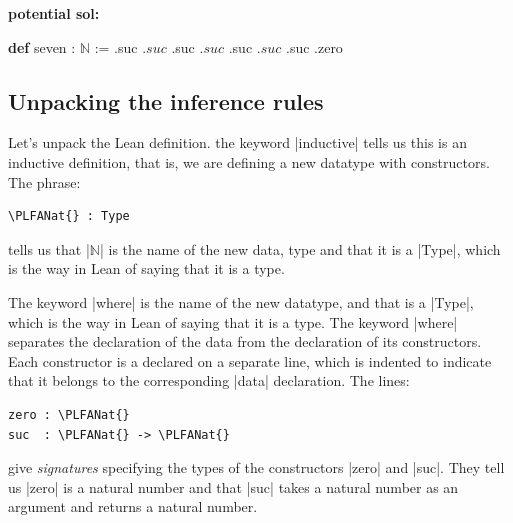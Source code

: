\documentclass{memoir}
\newcommand{\PLFANat}{\ensuremath{\mathbb{N}}}
\begin{document}
\par
\textbf{potential sol:}

\par
\begin{LeanVerbatim}
\textbf{def} seven : \PLFANat{} :=
  .suc $ .suc $ .suc $ .suc $ .suc $ .suc $ .suc .zero
\end{LeanVerbatim}

\par

\subsection{Unpacking the inference rules}\label{PLFA--in--Lean----Part--1----Naturals----Unpacking--the--inference--rules}

\par
Let's unpack the Lean definition. the keyword \LeanVerb|inductive| tells us this is an
inductive definition, that is, we are defining a new datatype with constructors.
The phrase:

\par
\begin{verbatim}
\PLFANat{} : Type
\end{verbatim}

\par
tells us that \LeanVerb|\PLFANat{}| is the name of the new data, type and that it is a \LeanVerb|Type|,
which is the way in Lean of saying that it is a type.

\par
The keyword \LeanVerb|where| is the name of the new datatype, and that is a \LeanVerb|Type|,
which is the way in Lean of saying that it is a type. The keyword \LeanVerb|where|
separates the declaration of the data from the declaration of its constructors.
Each constructor is a declared on a separate line, which is indented to
indicate that it belongs to the corresponding \LeanVerb|data| declaration. The lines:

\par
\begin{verbatim}
zero : \PLFANat{}
suc  : \PLFANat{} -> \PLFANat{}
\end{verbatim}

\par
give \emph{signatures} specifying the types of the constructors \LeanVerb|zero| and \LeanVerb|suc|.
They tell us \LeanVerb|zero| is a natural number and that \LeanVerb|suc| takes a natural number as
an argument and returns a natural number.
\end{document}
